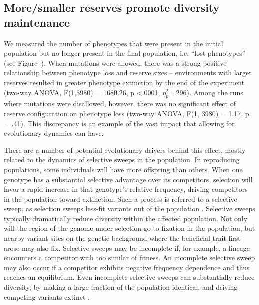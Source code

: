 \documentclass[letterpaper]{article}
\begin{document}
\subsection{More/smaller reserves promote diversity maintenance}

	We measured the number of phenotypes that were present in the initial population but no longer present in the final population, i.e. “lost phenotypes” (see Figure~\label{fig:diversitygenerationmaintenance}).  When mutations were allowed, there was a strong positive relationship between phenotype loss and reserve sizes – environments with larger reserves resulted in greater phenotype extinction by the end of the experiment (two-way ANOVA, F(1,3980) = 1680.26, p \textless .0001, $\eta_{p}^{2}$=.296).  Among the runs where mutations were disallowed, however, there was no significant effect of reserve configuration on phenotype loss (two-way ANOVA, F(1, 3980) = 1.17, p = .41). This discrepancy is an example of the vast impact that allowing for evolutionary dynamics can have. 

There are a number of potential evolutionary drivers behind this effect, mostly related to the dynamics of selective sweeps in the population. In reproducing populations, some individuals will have more offspring than others.  When one genotype has a substantial selective advantage over its competitors, selection will favor a rapid increase in that genotype’s relative frequency, driving competitors in the population toward extinction.  Such a process is referred to a selective sweep, as selection sweeps less-fit variants out of the population \cite{mcvean_structure_2007}.  Selective sweeps typically dramatically reduce diversity within the affected population.  Not only will the region of the genome under selection go to fixation in the population, but nearby variant sites on the genetic background where the beneficial trait first arose may also fix.  Selective sweeps may be incomplete if, for example, a lineage encounters a competitor with too similar of fitness. An incomplete selective sweep may also occur if a competitor exhibits negative frequency dependence and thus reaches an equilibrium.  Even incomplete selective sweeps can substantially reduce diversity, by making a large fraction of the population identical, and driving competing variants extinct .
%
%
%
\end{document}
